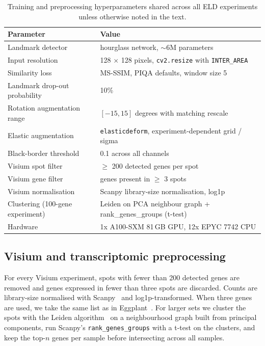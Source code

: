 \documentclass[11pt]{article}
\begin{document}
\begin{table}[htbp]
\centering
\caption{Training and preprocessing hyperparameters shared across all ELD experiments unless otherwise noted in the text.}
\label{tab:hyperparameters}
\begin{tabular}{ll}
\toprule
Parameter & Value \\
\midrule
Landmark detector & hourglass network, $\sim$6M parameters~\cite{sanchez2019object,newell2016stacked} \\
Input resolution & 128 $\times$ 128 pixels, \texttt{cv2.resize} with \texttt{INTER\_AREA} \\
Similarity loss & MS-SSIM, PIQA defaults, window size 5~\cite{wang2003multiscale} \\
Landmark drop-out probability & 10\% \\
Rotation augmentation range & $[-15, 15]$ degrees with matching rescale \\
Elastic augmentation & \texttt{elasticdeform}, experiment-dependent grid / sigma \\
Black-border threshold & 0.1 across all channels \\
Visium spot filter & $\geq$ 200 detected genes per spot \\
Visium gene filter & genes present in $\geq$ 3 spots \\
Visium normalisation & Scanpy library-size normalisation, log1p \\
Clustering (100-gene experiment) & Leiden on PCA neighbour graph + rank\_genes\_groups (t-test) \\
Hardware & 1x A100-SXM 81\,GB GPU, 12x EPYC 7742 CPU \\
\bottomrule
\end{tabular}
\end{table}

\subsection{Visium and transcriptomic preprocessing}

For every Visium experiment, spots with fewer than 200 detected genes are removed and genes expressed in fewer than three spots are discarded. Counts are library-size normalised with Scanpy~\cite{wolf2018scanpy} and log1p-transformed. When three genes are used, we take the same list as in Eggplant~\cite{bergenstrahle2021eggplant}. For larger sets we cluster the spots with the Leiden algorithm~\cite{traag2019louvain} on a neighbourhood graph built from principal components, run Scanpy's \texttt{rank\_genes\_groups} with a t-test on the clusters, and keep the top-$n$ genes per sample before intersecting across all samples.
\end{document}
